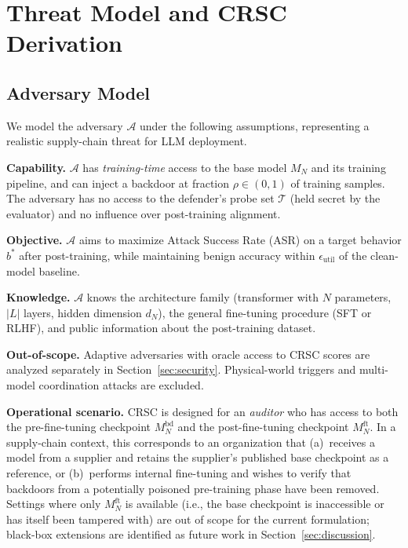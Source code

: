 
\section{Threat Model and CRSC Derivation}
\label{sec:threat}

\subsection{Adversary Model}

We model the adversary $\mathcal{A}$ under the following assumptions,
representing a realistic supply-chain threat for LLM deployment.

\textbf{Capability.} $\mathcal{A}$ has \emph{training-time} access to the
base model $M_N$ and its training pipeline, and can inject a backdoor at
fraction $\rho \in (0,1)$ of training samples.
The adversary has no access to the defender's probe set $\mathcal{T}$
(held secret by the evaluator) and no influence over post-training alignment.

\textbf{Objective.} $\mathcal{A}$ aims to maximize Attack Success Rate (ASR)
on a target behavior $b^*$ after post-training, while maintaining benign
accuracy within $\epsilon_{\text{util}}$ of the clean-model baseline.

\textbf{Knowledge.} $\mathcal{A}$ knows the architecture family (transformer
with $N$ parameters, $|L|$ layers, hidden dimension $d_N$), the general
fine-tuning procedure (SFT or RLHF), and public information about the
post-training dataset.

\textbf{Out-of-scope.} Adaptive adversaries with oracle access to CRSC
scores are analyzed separately in Section~\ref{sec:security}.
Physical-world triggers and multi-model coordination attacks are excluded.

\textbf{Operational scenario.}
CRSC is designed for an \emph{auditor} who has access to both the
pre-fine-tuning checkpoint $M_N^{\text{bd}}$ and the post-fine-tuning
checkpoint $M_N^{\text{ft}}$.
In a supply-chain context, this corresponds to an organization that (a)~receives
a model from a supplier and retains the supplier's published base checkpoint as
a reference, or (b)~performs internal fine-tuning and wishes to verify that
backdoors from a potentially poisoned pre-training phase have been removed.
Settings where only $M_N^{\text{ft}}$ is available (i.e., the base checkpoint
is inaccessible or has itself been tampered with) are out of scope for the current
formulation; black-box extensions are identified as future work in
Section~\ref{sec:discussion}.

